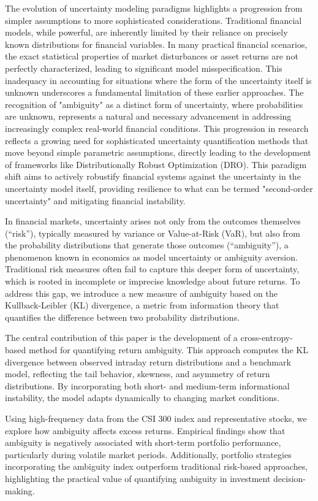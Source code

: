 \documentclass[preprint,12pt,authoryear]{elsarticle}
\begin{document}
The evolution of uncertainty modeling paradigms highlights a progression from simpler assumptions to more sophisticated considerations. Traditional financial models, while powerful, are inherently limited by their reliance on precisely known distributions for financial variables. In many practical financial scenarios, the exact statistical properties of market disturbances or asset returns are not perfectly characterized, leading to significant model misspecification. This inadequacy in accounting for situations where the form of the uncertainty itself is unknown underscores a fundamental limitation of these earlier approaches. The recognition of "ambiguity" as a distinct form of uncertainty, where probabilities are unknown, represents a natural and necessary advancement in addressing increasingly complex real-world financial conditions. This progression in research reflects a growing need for sophisticated uncertainty quantification methods that move beyond simple parametric assumptions, directly leading to the development of frameworks like Distributionally Robust Optimization (DRO). This paradigm shift aims to actively robustify financial systems against the uncertainty in the uncertainty model itself, providing resilience to what can be termed "second-order uncertainty" and mitigating financial instability.

In financial markets, uncertainty arises not only from the outcomes themselves (``risk''), typically measured by variance or Value-at-Risk (VaR), but also from the probability distributions that generate those outcomes (``ambiguity''), a phenomenon known in economics as model uncertainty or ambiguity aversion. Traditional risk measures often fail to capture this deeper form of uncertainty, which is rooted in incomplete or imprecise knowledge about future returns. To address this gap, we introduce a new measure of ambiguity based on the Kullback-Leibler (KL) divergence, a metric from information theory that quantifies the difference between two probability distributions. 

The central contribution of this paper is the development of a cross-entropy-based method for quantifying return ambiguity. This approach computes the KL divergence between observed intraday return distributions and a benchmark model, reflecting the tail behavior, skewness, and asymmetry of return distributions. By incorporating both short- and medium-term informational instability, the model adapts dynamically to changing market conditions.

Using high-frequency data from the CSI 300 index and representative stocks, we explore how ambiguity affects excess returns. Empirical findings show that ambiguity is negatively associated with short-term portfolio performance, particularly during volatile market periods. Additionally, portfolio strategies incorporating the ambiguity index outperform traditional risk-based approaches, highlighting the practical value of quantifying ambiguity in investment decision-making.
\end{document}
